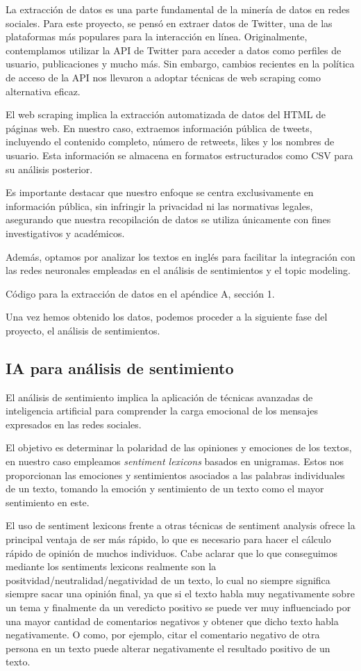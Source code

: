 \documentclass[
  letterpaper,
  DIV=11,
  numbers=noendperiod]{scrartcl}
\begin{document}
La extracción de datos es una parte fundamental de la minería de datos
en redes sociales. Para este proyecto, se pensó en extraer datos de
Twitter, una de las plataformas más populares para la interacción en
línea. Originalmente, contemplamos utilizar la API de Twitter para
acceder a datos como perfiles de usuario, publicaciones y mucho más. Sin
embargo, cambios recientes en la política de acceso de la API nos
llevaron a adoptar técnicas de web scraping como alternativa eficaz.

El web scraping implica la extracción automatizada de datos del HTML de
páginas web. En nuestro caso, extraemos información pública de tweets,
incluyendo el contenido completo, número de retweets, likes y los
nombres de usuario. Esta información se almacena en formatos
estructurados como CSV para su análisis posterior.

Es importante destacar que nuestro enfoque se centra exclusivamente en
información pública, sin infringir la privacidad ni las normativas
legales, asegurando que nuestra recopilación de datos se utiliza
únicamente con fines investigativos y académicos.

Además, optamos por analizar los textos en inglés para facilitar la
integración con las redes neuronales empleadas en el análisis de
sentimientos y el topic modeling.

Código para la extracción de datos en el apéndice A, sección 1.

Una vez hemos obtenido los datos, podemos proceder a la siguiente fase
del proyecto, el análisis de sentimientos.

\subsection{IA para análisis de
sentimiento}\label{ia-para-anuxe1lisis-de-sentimiento}

El análisis de sentimiento implica la aplicación de técnicas avanzadas
de inteligencia artificial para comprender la carga emocional de los
mensajes expresados en las redes sociales.

El objetivo es determinar la polaridad de las opiniones y emociones de
los textos, en nuestro caso empleamos \emph{sentiment lexicons} basados
en unigramas. Estos nos proporcionan las emociones y sentimientos
asociados a las palabras individuales de un texto, tomando la emoción y
sentimiento de un texto como el mayor sentimiento en este.

El uso de sentiment lexicons frente a otras técnicas de sentiment
analysis ofrece la principal ventaja de ser más rápido, lo que es
necesario para hacer el cálculo rápido de opinión de muchos individuos.
Cabe aclarar que lo que conseguimos mediante los sentiments lexicons
realmente son la positvidad/neutralidad/negatividad de un texto, lo cual
no siempre significa siempre sacar una opinión final, ya que si el texto
habla muy negativamente sobre un tema y finalmente da un veredicto
positivo se puede ver muy influenciado por una mayor cantidad de
comentarios negativos y obtener que dicho texto habla negativamente. O
como, por ejemplo, citar el comentario negativo de otra persona en un
texto puede alterar negativamente el resultado positivo de un texto.
\end{document}
